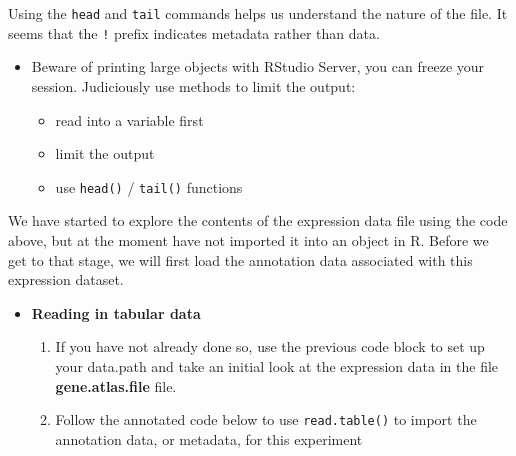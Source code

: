 \documentclass[a4paper]{book}
\providecommand{\tightlist}{%
  \setlength{\itemsep}{0pt}\setlength{\parskip}{0pt}}
\newenvironment{rmdblock}[1]
  {\vspace{1.5em}\begin{shaded*}
  \begin{itemize}
  \renewcommand{\labelitemi}{
    \raisebox{-.7\height}[0pt][0pt]{
      {\setkeys{Gin}{width=3em,keepaspectratio}\texttt{[image: images/\#1]}}
    }
  }
  \item
  }
  {
  \end{itemize}
  \end{shaded*}
  }
\newenvironment{rmdcaution}
  {\begin{rmdblock}{caution}}
  {\end{rmdblock}}
\newenvironment{rmdexercise}
  {\begin{rmdblock}{exercise}}
  {\end{rmdblock}}
\begin{document}
Using the \texttt{head} and \texttt{tail} commands helps us understand
the nature of the file. It seems that the \texttt{!} prefix indicates
metadata rather than data.

\begin{rmdcaution}
Beware of printing large objects with RStudio Server, you can freeze
your session. Judiciously use methods to limit the output:

\begin{itemize}
\tightlist
\item
  read into a variable first
\item
  limit the output
\item
  use \texttt{head()} / \texttt{tail()} functions
\end{itemize}
\end{rmdcaution}

We have started to explore the contents of the expression data file
using the code above, but at the moment have not imported it into an
object in R. Before we get to that stage, we will first load the
annotation data associated with this expression dataset.

\begin{rmdexercise}
\textbf{Reading in tabular data}

\begin{enumerate}
\def\labelenumi{\arabic{enumi}.}
\item
  If you have not already done so, use the previous code block to set up
  your data.path and take an initial look at the expression data in the
  file \textbf{gene.atlas.file} file.
\item
  Follow the annotated code below to use \texttt{read.table()} to import
  the annotation data, or metadata, for this experiment
\end{enumerate}
\end{rmdexercise}
\end{document}
